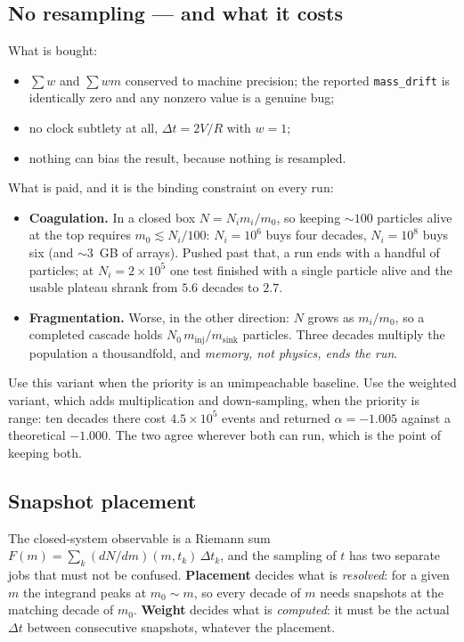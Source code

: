 \documentclass[a4paper,12pt]{article}
\newcommand{\minj}{m_{\mathrm{inj}}}
\newcommand{\msink}{m_{\mathrm{sink}}}
\newcommand{\code}[1]{\texttt{#1}}
\begin{document}
\subsection{No resampling --- and what it costs}
\label{sec:num_cost}

What is bought:
\begin{itemize}
  \item $\sum w$ and $\sum wm$ conserved to machine precision; the reported
        \code{mass\_drift} is identically zero and any nonzero value is a
        genuine bug;
  \item no clock subtlety at all, $\Delta t = 2V/R$ with $w=1$;
  \item nothing can bias the result, because nothing is resampled.
\end{itemize}

What is paid, and it is the binding constraint on every run:
\begin{itemize}
  \item \textbf{Coagulation.} In a closed box $N = N_i m_i/m_0$, so keeping
        $\sim100$ particles alive at the top requires $m_0 \lesssim N_i/100$:
        $N_i = 10^6$ buys four decades, $N_i = 10^8$ buys six (and
        $\sim3$~GB of arrays). Pushed past that, a run ends with a handful of
        particles; at $N_i = 2\times10^5$ one test finished with a single
        particle alive and the usable plateau shrank from $5.6$ decades to
        $2.7$.
  \item \textbf{Fragmentation.} Worse, in the other direction: $N$ grows as
        $m_i/m_0$, so a completed cascade holds $N_0\,\minj/\msink$
        particles. Three decades multiply the population a thousandfold, and
        \emph{memory, not physics, ends the run}.
\end{itemize}

Use this variant when the priority is an unimpeachable baseline. Use the
weighted variant, which adds multiplication and down-sampling, when the
priority is range: ten decades there cost $4.5\times10^5$ events and returned
$\alpha = -1.005$ against a theoretical $-1.000$. The two agree wherever both
can run, which is the point of keeping both.

\subsection{Snapshot placement}
\label{sec:trick10}

The closed-system observable is a Riemann sum
$F(m) = \sum_k (dN/dm)(m,t_k)\,\Delta t_k$, and the sampling of $t$ has two
separate jobs that must not be confused. \textbf{Placement} decides what is
\emph{resolved}: for a given $m$ the integrand peaks at $m_0 \sim m$, so
every decade of $m$ needs snapshots at the matching decade of $m_0$.
\textbf{Weight} decides what is \emph{computed}: it must be the actual
$\Delta t$ between consecutive snapshots, whatever the placement.
\end{document}
